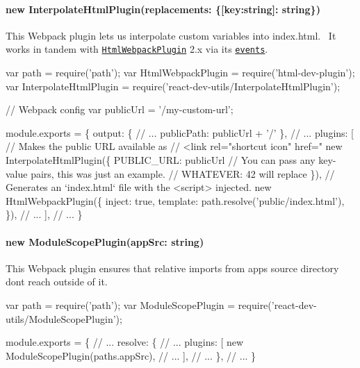 \paragraph*{{\ttfamily new Interpolate\+Html\+Plugin(replacements\+: \{\mbox{[}key\+:string\mbox{]}\+: string\})}}

This Webpack plugin lets us interpolate custom variables into {\ttfamily index.\+html}.~\newline
 It works in tandem with \href{https://github.com/ampedandwired/html-webpack-plugin}{\tt Html\+Webpack\+Plugin} 2.\+x via its \href{https://github.com/ampedandwired/html-webpack-plugin#events}{\tt events}.


\begin{DoxyCode}
var path = require('path');
var HtmlWebpackPlugin = require('html-dev-plugin');
var InterpolateHtmlPlugin = require('react-dev-utils/InterpolateHtmlPlugin');

// Webpack config
var publicUrl = '/my-custom-url';

module.exports = \{
  output: \{
    // ...
    publicPath: publicUrl + '/'
  \},
  // ...
  plugins: [
    // Makes the public URL available as %
    // <link rel="shortcut icon" href="%
    new InterpolateHtmlPlugin(\{
      PUBLIC\_URL: publicUrl
      // You can pass any key-value pairs, this was just an example.
      // WHATEVER: 42 will replace %
    \}),
    // Generates an `index.html` file with the <script> injected.
    new HtmlWebpackPlugin(\{
      inject: true,
      template: path.resolve('public/index.html'),
    \}),
    // ...
  ],
  // ...
\}
\end{DoxyCode}


\paragraph*{{\ttfamily new Module\+Scope\+Plugin(app\+Src\+: string)}}

This Webpack plugin ensures that relative imports from app\textquotesingle{}s source directory don\textquotesingle{}t reach outside of it.


\begin{DoxyCode}
var path = require('path');
var ModuleScopePlugin = require('react-dev-utils/ModuleScopePlugin');


module.exports = \{
  // ...
  resolve: \{
    // ...
    plugins: [
      new ModuleScopePlugin(paths.appSrc),
      // ...
    ],
    // ...
  \},
  // ...
\}
\end{DoxyCode}


